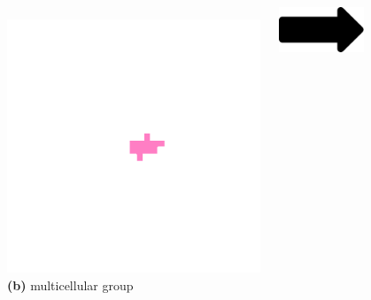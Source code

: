\begin{figure}
\begin{columns}
\begin{column}{0.20\textwidth}
  \centering
    \includegraphics[width=\textwidth,trim={300 300 250 300},clip]{img/lifecycle-2}\\
    \footnotesize \textbf{(b)} multicellular group
\end{column}
\begin{column}{0.05\textwidth}
  \vspace{3ex}
  \includegraphics[width=\textwidth]{img/arrow}
\end{column}
\begin{column}{0.20\textwidth}
  \centering

\end{column}
\end{columns}
\end{figure}

